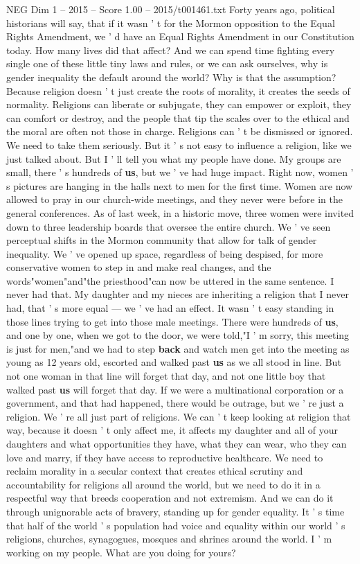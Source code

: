 \begin{textsample}{NEG Dim 1 – 2015 – Score 1.00 – 2015/t001461.txt}
Forty years ago, political historians will say, that if it wasn ' t for the Mormon opposition to the Equal Rights Amendment, we ' d have an Equal Rights Amendment in our Constitution today.
How many lives did that affect?
And we can spend time fighting every single one of these little tiny laws and rules, or we can ask ourselves, why is gender inequality the default around the world?
Why is that the assumption?
Because religion doesn ' t just create the roots of morality, it creates the seeds of normality.
Religions can liberate or subjugate, they can empower or exploit, they can comfort or destroy, and the people that tip the scales over to the ethical and the moral are often not those in charge.
Religions can ' t be dismissed or ignored.
We need to take them seriously.
But it ' s not easy to influence a religion, like we just talked about.
But I ' ll tell you what my people have done.
My groups are small, there ' s hundreds of \textbf{us}, but we ' ve had huge impact.
Right now, women ' s pictures are hanging in the halls next to men for the first time.
Women are now allowed to pray in our church-wide meetings, and they never were before in the general conferences.
As of last week, in a historic move, three women were invited down to three leadership boards that oversee the entire church.
We ' ve seen perceptual shifts in the Mormon community that allow for talk of gender inequality.
We ' ve opened up space, regardless of being despised, for more conservative women to step in and make real changes, and the words"women"and"the priesthood"can now be uttered in the same sentence.
I never had that.
My daughter and my nieces are inheriting a religion that I never had, that ' s more equal — we ' ve had an effect.
It wasn ' t easy standing in those lines trying to get into those male meetings.
There were hundreds of \textbf{us}, and one by one, when we got to the door, we were told,"I ' m sorry, this meeting is just for men,"and we had to step \textbf{back} and watch men get into the meeting as young as 12 years old, escorted and walked past \textbf{us} as we all stood in line.
But not one woman in that line will forget that day, and not one little boy that walked past \textbf{us} will forget that day.
If we were a multinational corporation or a government, and that had happened, there would be outrage, but we ' re just a religion.
We ' re all just part of religions.
We can ' t keep looking at religion that way, because it doesn ' t only affect me, it affects my daughter and all of your daughters and what opportunities they have, what they can wear, who they can love and marry, if they have access to reproductive healthcare.
We need to reclaim morality in a secular context that creates ethical scrutiny and accountability for religions all around the world, but we need to do it in a respectful way that breeds cooperation and not extremism.
And we can do it through unignorable acts of bravery, standing up for gender equality.
It ' s time that half of the world ' s population had voice and equality within our world ' s religions, churches, synagogues, mosques and shrines around the world.
I ' m working on my people.
What are you doing for yours?

\end{textsample}
